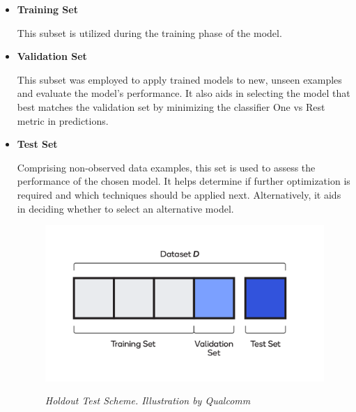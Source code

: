 \begin{itemize}

  \item \textbf{Training Set}

    This subset is utilized during the training phase of the model.

  \item \textbf{Validation Set}

    This subset was employed to apply trained models to new, unseen examples
    and evaluate the model's performance. It also aids in selecting the model
    that best matches the validation set by minimizing the classifier One vs
    Rest metric in predictions.

  \item \textbf{Test Set}

    Comprising non-observed data examples, this set is used to assess the
    performance of the chosen model. It helps determine if further optimization
    is required and which techniques should be applied next. Alternatively, it
    aids in deciding whether to select an alternative model.


    \begin{figure}[H]
      \centering
      \begin{adjustbox}{width=0.8\textwidth, trim={0cm 0.5cm 0cm 0.5cm}, clip}
        \includegraphics[width=\textwidth]{imatges/preliminaries/train-test-validation-sets.png}
      \end{adjustbox}
      \caption[Holdout Test Scheme]{\textit{Holdout Test Scheme. Illustration by Qualcomm}}
      {\label{fig:holdout-test-scheme}}
    \end{figure}

\end{itemize}

\newpage

